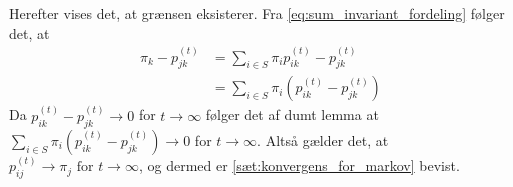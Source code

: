 \begin{bev}
Herefter vises det, at grænsen eksisterer. Fra \eqref{eq:sum_invariant_fordeling} følger det, at
\begin{align*}
    \pi_k-p_{jk}^{(t)}&=\sum_{i\in S}\pi_ip_{ik}^{(t)}-p_{jk}^{(t)}\\
    &=\sum_{i\in S}\pi_i(p_{ik}^{(t)}-p_{jk}^{(t)}) 
\end{align*}
Da $ p_{ik}^{(t)} - p_{jk}^{(t)} \to 0$ for $t\to \infty$ følger det af dumt lemma at $\sum_{i\in S}\pi_i(p_{ik}^{(t)}-p_{jk}^{(t)})\to 0 $ for $ t \to \infty$.
Altså gælder det, at $p_{ij}^{(t)} \to \pi_j \text{ for } t \to \infty$, og dermed er \autoref{sæt:konvergens_for_markov} bevist.
\end{bev}










